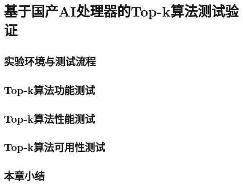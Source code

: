 \chapter{基于国产AI处理器的Top-k算法测试验证}
\section{实验环境与测试流程}

\section{Top-k算法功能测试}
\section{Top-k算法性能测试}

\section{Top-k算法可用性测试}

\section{本章小结}
